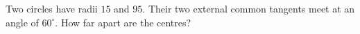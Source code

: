 Two circles have radii $15$ and $95$. Their two external common tangents meet at an angle of $60^\circ$. How far apart are the centres?
